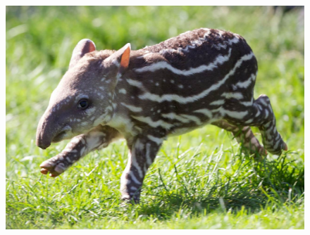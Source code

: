 \documentclass[11pt]{sensys-proc}
\begin{document}
\begin{figure}[hb]
  \centering
  \includegraphics[width=0.9\columnwidth]{figs/tapir}
\end{figure}


\balance

\end{document}
